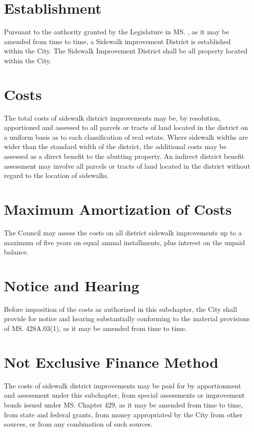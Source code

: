 
\setcounter{section}{19}
\section{Establishment}
Pursuant to the authority granted by the Legislature in MS. , as it may be amended from time to time, a Sidewalk improvement District is established within the City. The Sidewalk Improvement District shall be all property located within the City.
\section{Costs}
The total costs of sidewalk district improvements may be, by resolution, apportioned and assessed to all parcels or tracts of land located in the district on a uniform basis as to each classification of real estate. Where sidewalk widths are wider than the standard width of the district, the additional costs may be assessed as a direct benefit to the abutting property. An indirect district benefit assessment may involve all parcels or tracts of land located in the district without regard to the location of sidewalks.
\section{Maximum Amortization of Costs}
The Council may assess the costs on all district sidewalk improvements up to a maximum of five years on equal annual installments, plus interest on the unpaid balance.
\section{Notice and Hearing}
Before imposition of the costs as authorized in this subchapter, the City shall provide for notice and hearing substantially conforming to the material provisions of MS. \textsection 428A.03(1), as it may be amended from time to time.
\section{Not Exclusive Finance Method}
The costs of sidewalk district improvements may be paid for by apportionment and assessment under this subchapter, from special assessments or improvement bonds issued under MS. Chapter 429, as it may be amended from time to time, from state and federal grants, from money appropriated by the City from other sources, or from any combination of such sources.
